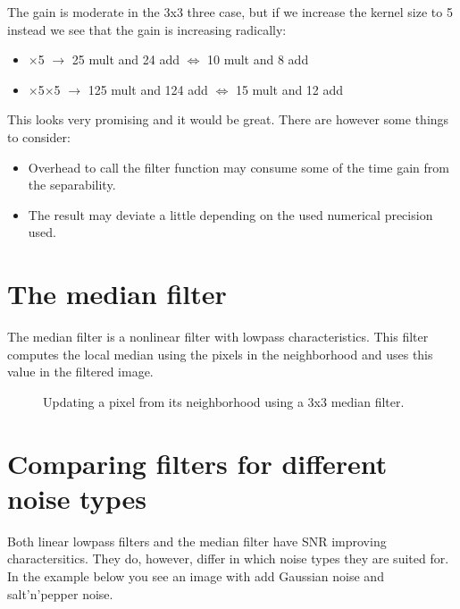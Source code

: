 \documentclass[letterpaper,10pt,english]{sphinxmanual}
\begin{document}
\sphinxAtStartPar
The gain is moderate in the 3x3 three case, but if we increase the kernel size to 5 instead we see that the gain is increasing radically:
\begin{itemize}
\item {} 
\(\times\)5 \(\rightarrow\) 25 mult and 24 add \(\Leftrightarrow\) 10 mult and 8 add

\item {} 
\(\times\)5\(\times\)5 \(\rightarrow\) 125 mult and 124 add \(\Leftrightarrow\) 15 mult and 12 add

\end{itemize}

\sphinxAtStartPar
This looks very promising and it would be great. There are however some things to consider:
\begin{itemize}
\item {} 
\sphinxAtStartPar
Overhead to call the filter function may consume some of the time gain from the separability.

\item {} 
\sphinxAtStartPar
The result may deviate a little depending on the used numerical precision used.

\end{itemize}


\section{The median filter}
\label{\detokenize{02-ImageEnhancement:the-median-filter}}
\sphinxAtStartPar
The median filter is a non\sphinxhyphen{}linear filter with low\sphinxhyphen{}pass characteristics. This filter computes the local median using the pixels in the neighborhood and uses this value in the filtered image.

\begin{figure}[htbp]
\centering
\capstart

\noindent{}
\caption{Updating a pixel from its neighborhood using a 3x3 median filter.}\label{\detokenize{02-ImageEnhancement:id10}}\end{figure}




\section{Comparing filters for different noise types}
\label{\detokenize{02-ImageEnhancement:comparing-filters-for-different-noise-types}}
\sphinxAtStartPar
Both linear low\sphinxhyphen{}pass filters and the median filter have SNR improving charactersitics. They do, however, differ in which noise types they are suited for. In the example below you see an image with add Gaussian noise and salt’n’pepper noise.
\end{document}
